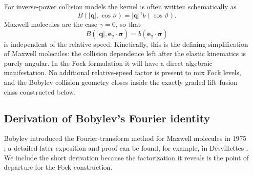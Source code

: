 \documentclass[11pt,oneside]{article}
\numberwithin{equation}{section}
\theoremstyle{definition}
\begin{document}
For inverse-power collision models the kernel is often written schematically as
\begin{equation}
B(|\bm q|,\cos\vartheta)=|\bm q|^\gamma b(\cos\vartheta).
\end{equation}
Maxwell molecules are the case $\gamma=0$, so that
\begin{equation}
B(|\bm q|,{\bm e}_q\!\cdot\!\bm\sigma)
=b({\bm e}_q\!\cdot\!\bm\sigma)
\label{eq:maxwell_kernel_velocity}
\end{equation}
is independent of the relative speed.  Kinetically, this is the defining simplification of Maxwell molecules: the collision dependence left after the elastic kinematics is purely angular.  In the Fock formulation it will have a direct algebraic manifestation.  No additional relative-speed factor is present to mix Fock levels, and the Bobylev collision geometry closes inside the exactly graded lift--fusion class constructed below.

\subsection{Derivation of Bobylev's Fourier identity}
\label{subsec:maxwell_bobylev_derivation}

Bobylev introduced the Fourier-transform method for Maxwell molecules in 1975 \cite{Bobylev1975Fourier}; a detailed later exposition and proof can be found, for example, in Desvillettes \cite{Desvillettes2003FourierBoltzmann}.  We include the short derivation because the factorization it reveals is the point of departure for the Fock construction.
\end{document}
